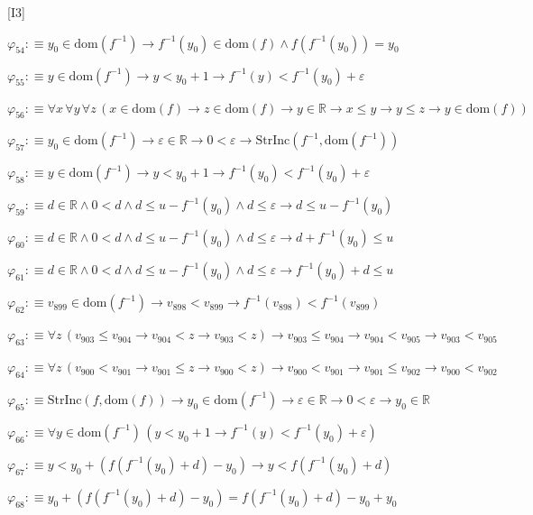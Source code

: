 \begin{fullproof}{[I3]}
\begin{abbrevlist}
\item $\varphi_{54} :\equiv y_{0} \in \mathrm{dom}(f^{-1}) \to f^{-1}(y_{0}) \in \mathrm{dom}(f) \land f(f^{-1}(y_{0})) = y_{0}$
\item $\varphi_{55} :\equiv y \in \mathrm{dom}(f^{-1}) \to y < y_{0} + 1 \to f^{-1}(y) < f^{-1}(y_{0}) + \varepsilon$
\item $\varphi_{56} :\equiv \forall x\,\forall y\,\forall z\,(x \in \mathrm{dom}(f) \to z \in \mathrm{dom}(f) \to y \in \mathbb{R} \to x \leq y \to y \leq z \to y \in \mathrm{dom}(f))$
\item $\varphi_{57} :\equiv y_{0} \in \mathrm{dom}(f^{-1}) \to \varepsilon \in \mathbb{R} \to 0 < \varepsilon \to \mathrm{StrInc}(f^{-1},\mathrm{dom}(f^{-1}))$
\item $\varphi_{58} :\equiv y \in \mathrm{dom}(f^{-1}) \to y < y_{0} + 1 \to f^{-1}(y_{0}) < f^{-1}(y_{0}) + \varepsilon$
\item $\varphi_{59} :\equiv d \in \mathbb{R} \land 0 < d \land d \leq u - f^{-1}(y_{0}) \land d \leq \varepsilon \to d \leq u - f^{-1}(y_{0})$
\item $\varphi_{60} :\equiv d \in \mathbb{R} \land 0 < d \land d \leq u - f^{-1}(y_{0}) \land d \leq \varepsilon \to d + f^{-1}(y_{0}) \leq u$
\item $\varphi_{61} :\equiv d \in \mathbb{R} \land 0 < d \land d \leq u - f^{-1}(y_{0}) \land d \leq \varepsilon \to f^{-1}(y_{0}) + d \leq u$
\item $\varphi_{62} :\equiv v_{899} \in \mathrm{dom}(f^{-1}) \to v_{898} < v_{899} \to f^{-1}(v_{898}) < f^{-1}(v_{899})$
\item $\varphi_{63} :\equiv \forall z\,(v_{903} \leq v_{904} \to v_{904} < z \to v_{903} < z) \to v_{903} \leq v_{904} \to v_{904} < v_{905} \to v_{903} < v_{905}$
\item $\varphi_{64} :\equiv \forall z\,(v_{900} < v_{901} \to v_{901} \leq z \to v_{900} < z) \to v_{900} < v_{901} \to v_{901} \leq v_{902} \to v_{900} < v_{902}$
\item $\varphi_{65} :\equiv \mathrm{StrInc}(f,\mathrm{dom}(f)) \to y_{0} \in \mathrm{dom}(f^{-1}) \to \varepsilon \in \mathbb{R} \to 0 < \varepsilon \to y_{0} \in \mathbb{R}$
\item $\varphi_{66} :\equiv \forall y \in \mathrm{dom}(f^{-1})\,(y < y_{0} + 1 \to f^{-1}(y) < f^{-1}(y_{0}) + \varepsilon)$
\item $\varphi_{67} :\equiv y < y_{0} + (f(f^{-1}(y_{0}) + d) - y_{0}) \to y < f(f^{-1}(y_{0}) + d)$
\item $\varphi_{68} :\equiv y_{0} + (f(f^{-1}(y_{0}) + d) - y_{0}) = f(f^{-1}(y_{0}) + d) - y_{0} + y_{0}$

\end{abbrevlist}
\end{fullproof}
